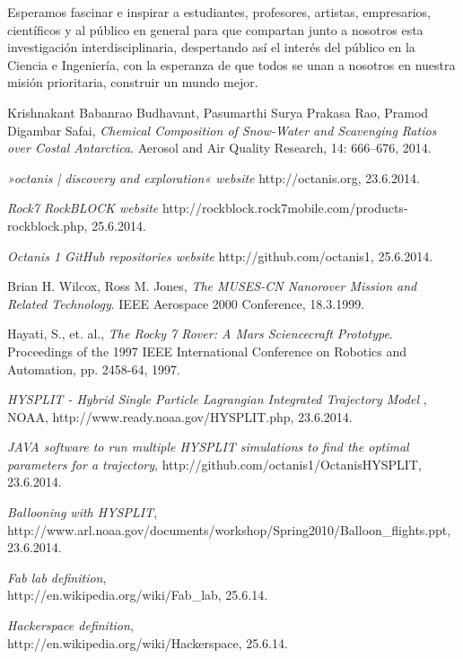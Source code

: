\documentclass[a4paper,12pt]{article}
\begin{document}
Esperamos fascinar e inspirar a estudiantes, profesores, artistas, empresarios, científicos y al público en general para que compartan junto a nosotros esta investigación interdisciplinaria, despertando así el interés del público en la Ciencia e Ingeniería, con la esperanza de que todos se unan a nosotros en nuestra misión prioritaria, construir un mundo mejor.


\pagebreak
\pagestyle{empty}
\begin{thebibliography}{14}


  Krishnakant Babanrao Budhavant, Pasumarthi Surya Prakasa Rao, Pramod Digambar Safai,
  \emph{Chemical Composition of Snow-Water and Scavenging Ratios over Costal Antarctica}.
  Aerosol and Air Quality Research, 14: 666–676, 2014.

{\em »octanis | discovery and exploration« website} http://octanis.org, 23.6.2014.

{\em Rock7 RockBLOCK website} http://rockblock.rock7mobile.com/products-rockblock.php, 25.6.2014.


{\em Octanis 1 GitHub repositories website} http://github.com/octanis1, 25.6.2014.

  Brian H. Wilcox, Ross M. Jones, 
  \emph{The MUSES-CN Nanorover Mission and Related Technology}.
  IEEE Aerospace 2000 Conference, 18.3.1999.


  Hayati, S., et. al., 
  \emph{The Rocky 7 Rover: A Mars Sciencecraft Prototype}.
  Proceedings of the 1997 IEEE International Conference on Robotics and Automation, pp. 2458-64, 1997.

  {\em HYSPLIT - Hybrid Single Particle Lagrangian Integrated Trajectory Model }, NOAA, http://www.ready.noaa.gov/HYSPLIT.php, 23.6.2014.

  {\em JAVA software to run multiple HYSPLIT simulations to find the optimal parameters for a trajectory}, http://github.com/octanis1/OctanisHYSPLIT, 23.6.2014.

	{\em Ballooning with HYSPLIT}, \\
	http://www.arl.noaa.gov/documents/workshop/Spring2010/Balloon\_flights.ppt, 23.6.2014.

	{\em Fab lab definition}, \\
	http://en.wikipedia.org/wiki/Fab\_lab, 25.6.14.

	{\em Hackerspace definition}, \\
	http://en.wikipedia.org/wiki/Hackerspace, 25.6.14.


\end{thebibliography}
\end{document}
